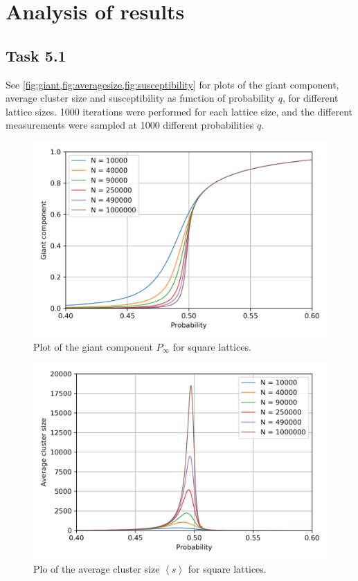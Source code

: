 \documentclass[a4paper]{article}
\begin{document}
\section{Analysis of results}
\subsection*{Task 5.1}
See \cref{fig:giant,fig:averagesize,fig:susceptibility} for plots of the giant component, average cluster size and susceptibility as function of probability $q$, for different lattice sizes. 1000 iterations were performed for each lattice size, and the different measurements were sampled at 1000 different probabilities $q$.

\begin{figure}[h]
    \centering
    \includegraphics[width=\textwidth]{giant.png}
    \caption{Plot of the giant component $P_\infty$ for square lattices.\label{fig:giant}}
\end{figure}

\begin{figure}[h]
    \centering
    \includegraphics[width=\textwidth]{averageSize.png}
    \caption{Plo of the average cluster size $\left<s\right>$ for square lattices.\label{fig:averagesize}}
\end{figure}
\end{document}
